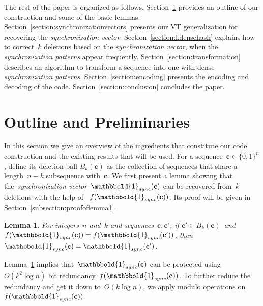 \documentclass[10pt,a4paper,onecolumn]{IEEEtran}
\newtheorem{lemma}{Lemma}
\newcommand{\1}{\mathbbold{1}}
\newcommand{\boldc}{\mathbf{c}}
\newcommand{\boldv}{\mathbf{v}}
\begin{document}
The rest of the paper is organized as follows. Section~\ref{section:outline} provides an outline of our construction and some of the basic lemmas. Section~\ref{section:synchronizationvectors} presents our VT generalization for recovering the \emph{synchronization vector}. Section~\ref{section:kdensehash} explains how to correct~$k$ deletions based on the \emph{synchronization vector}, when the \emph{synchronization patterns} appear frequently. Section~\ref{section:transformation} describes an algorithm to transform a sequence into one with dense \emph{synchronization patterns}. Section~\ref{section:encoding} presents the encoding and decoding of the code. Section~\ref{section:conclusion} concludes the paper. 

\section{Outline and Preliminaries}\label{section:outline}
In this section we give an overview of the ingredients that constitute our code construction and the existing results that will be used. For a sequence~$\boldc\in\{0,1\}^n$, define its deletion ball $B_k(\boldc)$ as the collection of sequences that share a length~$n-k$ subsequence with~$\boldc$. 
We first present a lemma showing that
the~\emph{synchronization vector}~$\1_{sync}(\boldc)$ can be recovered from~$k$ deletions with the help of 
~$f(\1_{sync}(\boldc))$. Its proof will be given in Section~\ref{subsection:proofoflemma1}.
\begin{lemma}\label{lemma:syncvector}
For integers~$n$ and~$k$ and sequences~$\boldc,\boldc'$, if $\boldc'\in B_k(\boldc)$~and~$f(\1_{sync}(\boldc))=f(\1_{sync}(\boldc'))$, then~$\1_{sync}(\boldc)=\1_{sync}(\boldc')$.
\end{lemma}
Lemma~\ref{lemma:syncvector} implies that~$\1_{sync}(\boldc)$ can be protected using~$O(k^2\log n)$ bit redundancy~$f(\1_{sync}(\boldc))$. To further reduce the redundancy and get it down to~$O(k\log n)$, we apply modulo operations on~$f(\1_{sync}(\boldc))$.
\end{document}
